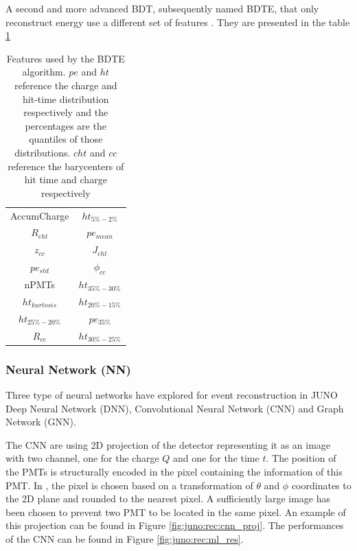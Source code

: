 \documentclass[../main.tex]{subfiles}
\begin{document}
A second and more advanced BDT, subsequently named BDTE, that only reconstruct energy use a different set of features \cite{gavrikov_energy_2022}. They are presented in the table \ref{tab:juno:rec:bdte}

\begin{table}
  \centering
  \begin{tabular}{|c|c|}
    \hline
    AccumCharge &  $ht_{5\%-2\%}$ \\
    $R_{cht}$ & $pe_{mean}$ \\
    $z_{cc}$ & $J_{cht}$ \\
    $pe_{std}$ & $\phi_{cc}$ \\
    nPMTs &  $ht_{35\%-30\%}$\\
    $ht_{kurtosis}$ & $ht_{20\%-15\%}$ \\
    $ht_{25\%-20\%}$ & $pe_{35\%}$ \\
    $R_{cc}$ & $ht_{30\%-25\%}$ \\
    \hline

  \end{tabular}
  \caption{Features used by the BDTE algorithm. $pe$ and $ht$ reference the charge and hit-time distribution respectively and the percentages are the quantiles of those distributions. $cht$ and $cc$ reference the barycenters of hit time and charge respectively}
  \label{tab:juno:rec:bdte}
\end{table}

\subsubsection{Neural Network (NN)}
Three type of neural networks have explored for event reconstruction in JUNO Deep Neural Network (DNN), Convolutional Neural Network (CNN) and Graph Network (GNN).

The CNN are using 2D projection of the detector representing it as an image with two channel, one for the charge $Q$ and one for the time $t$. The position of the PMTs is structurally encoded in the pixel containing the information of this PMT. In \cite{qian_vertex_2021}, the pixel is chosen based on a transformation of $\theta$ and $\phi$ coordinates to the 2D plane and rounded to the nearest pixel. A sufficiently large image has been chosen to prevent two PMT to be located in the same pixel. An example of this projection can be found in Figure \ref{fig:juno:rec:cnn_proj}. The performances of the CNN can be found in Figure \ref{fig:juno:rec:ml_res}.
\end{document}
